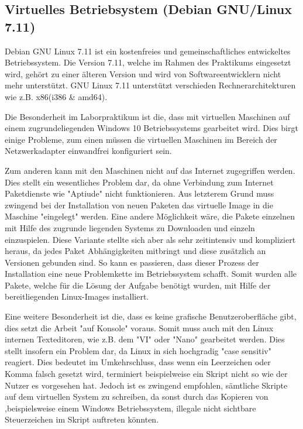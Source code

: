\documentclass[
a4paper,     %
 headsepline, %
footsepline, %
titlepage,   %
 halfparskip,     %
 fleqn,       %
12pt         %
]{scrartcl}  %
\begin{document}
\subsection{Virtuelles Betriebsystem (Debian GNU/Linux 7.11) }\label{Linux}
Debian GNU Linux 7.11 ist ein kostenfreies und gemeinschaftliches entwickeltes Betriebssystem. Die Version 7.11, welche im Rahmen des Praktikums eingesetzt wird, gehört zu einer älteren Version und wird von Softwareentwicklern nicht mehr unterstützt. GNU Linux 7.11 unterstützt verschieden Rechnerarchitekturen wie z.B. x86(i386 \& amd64). 

Die Besonderheit im Laborpraktikum ist die, dass mit virtuellen Maschinen auf einem zugrundeliegenden Windows 10 Betriebssystems gearbeitet wird. Dies birgt einige Probleme, zum einen müssen die virtuellen Maschinen im Bereich der Netzwerkadapter einwandfrei konfiguriert sein.

Zum anderen kann mit den Maschinen nicht auf das Internet zugegriffen werden. Dies stellt ein wesentliches Problem dar, da ohne Verbindung zum Internet Paketdienste wie "Aptiude" nicht funktionieren. Aus letzterem Grund muss zwingend bei der Installation von neuen Paketen das virtuelle Image in die Maschine "eingelegt" werden. Eine andere Möglichkeit wäre, die Pakete einzelnen mit Hilfe des zugrunde liegenden Systems zu Downloaden und einzeln einzuspielen. Diese Variante stellte sich aber als sehr zeitintensiv und kompliziert heraus, da jedes Paket Abhängigkeiten mitbringt und diese zusätzlich an Versionen gebunden sind. So kann es passieren, dass dieser Prozess der Installation eine neue Problemkette im Betriebssystem schafft. Somit wurden alle Pakete, welche für die Lösung der Aufgabe benötigt wurden, mit Hilfe der bereitliegenden Linux-Images installiert.  

Eine weitere Besonderheit ist die, dass es keine grafische Benutzeroberfläche gibt, dies setzt die Arbeit "auf Konsole" voraus.  Somit muss auch mit den Linux internen Texteditoren, wie z.B. dem "VI" oder "Nano" gearbeitet werden. Dies stellt insofern ein Problem dar, da Linux in sich hochgradig "case sensitiv" reagiert. Dies bedeutet im Umkehrschluss, dass wenn ein Leerzeichen oder Komma falsch gesetzt wird, terminiert beispielweise ein Skript nicht so wie der Nutzer es vorgesehen hat. Jedoch ist es zwingend empfohlen, sämtliche Skripte auf dem virtuellen System zu schreiben, da sonst durch das Kopieren von ,beispielsweise einem Windows Betriebssystem, illegale nicht sichtbare Steuerzeichen im Skript auftreten könnten\cite{editoren-3}. 
\end{document}
